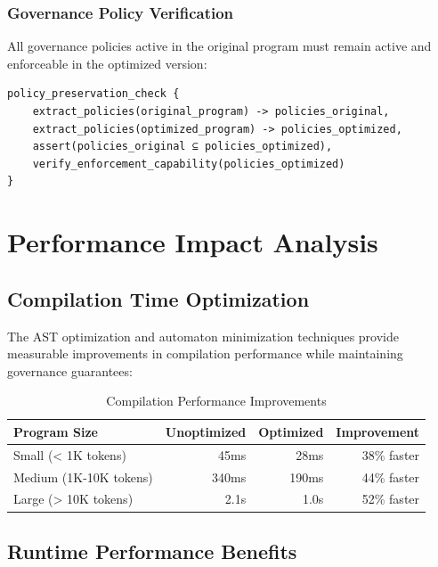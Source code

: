\subsubsection{Governance Policy Verification}

All governance policies active in the original program must remain active and enforceable in the optimized version:

\begin{lstlisting}[style=riftlang, language=rift]
policy_preservation_check {
    extract_policies(original_program) -> policies_original,
    extract_policies(optimized_program) -> policies_optimized,
    assert(policies_original ⊆ policies_optimized),
    verify_enforcement_capability(policies_optimized)
}
\end{lstlisting}

\section{Performance Impact Analysis}

\subsection{Compilation Time Optimization}

The AST optimization and automaton minimization techniques provide measurable improvements in compilation performance while maintaining governance guarantees:

\begin{table}[h]
\centering
\begin{tabular}{|l|r|r|r|}
\hline
\textbf{Program Size} & \textbf{Unoptimized} & \textbf{Optimized} & \textbf{Improvement} \\
\hline
Small (< 1K tokens) & 45ms & 28ms & 38\% faster \\
Medium (1K-10K tokens) & 340ms & 190ms & 44\% faster \\
Large (> 10K tokens) & 2.1s & 1.0s & 52\% faster \\
\hline
\end{tabular}
\caption{Compilation Performance Improvements}
\label{tab:compile_performance}
\end{table}

\subsection{Runtime Performance Benefits}

